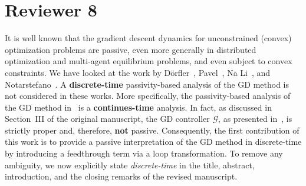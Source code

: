 \section*{Reviewer 8}\label{sec:reviewer8}
\renewcommand{\theequation}{R8.\arabic{equation}}
\setcounter{equation}{0}
\begin{rebuttal}
    {%
        It is well known that the gradient descent dynamics for unconstrained (convex) optimization problems are passive, even more generally in distributed optimization and multi-agent equilibrium problems, and even subject to convex constraints.
    }%
    {%
        We have looked at the work by Dörfler~\cite{dorfler_energy}, Pavel~\cite{pavel_passivity_ct}, Na Li~\cite{li_passivity}, and Notarstefano~\cite{Notarstefano}. A \textbf{discrete-time} passivity-based analysis of the GD method is not considered in these works. More specifically, the passivity-based analysis of the GD method in~\cite{pavel_passivity_ct,li_passivity} is a \textbf{continues-time} analysis. In fact, as discussed in Section~III of the original manuscript, the GD controller \(\bm{\mathcal{G}}\), as presented in~\cite{lessard_recht_iqc}, is strictly proper and, therefore, \textbf{not} passive. Consequently, the first contribution of this work is to provide a passive interpretation of the GD method in discrete-time by introducing a feedthrough term via a loop transformation. To remove any ambiguity, we now explicitly state \emph{discrete-time} in the title, abstract, introduction, and the closing remarks of the revised manuscript.
    }%
\end{rebuttal}
